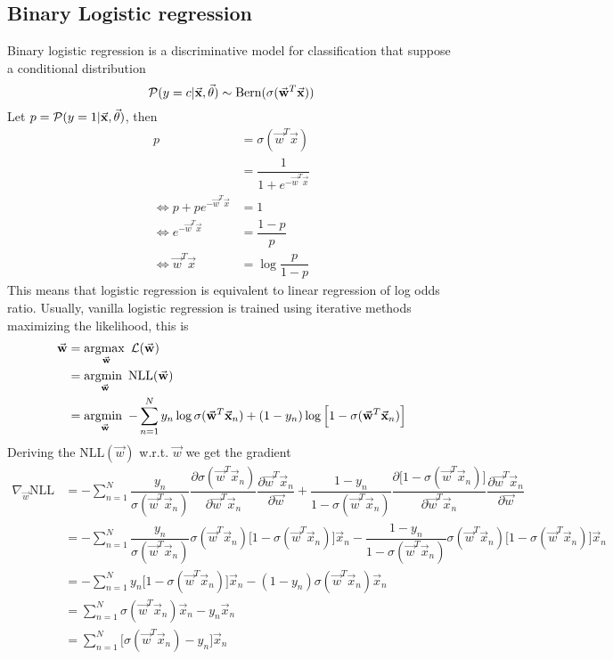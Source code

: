 \documentclass[../main.tex]{subfiles}
\begin{document}
\subsection{Binary Logistic regression}
Binary logistic regression is a discriminative model for classification that suppose a conditional distribution
\begin{equation*}
    \p(y=c|\vec{x},\vec{\theta}) \sim \text{Bern}(\sigma(\vec{w}^T \vec{x}))
\end{equation*}
Let $p=\p(y=1|\vec{x},\vec{\theta})$, then
\begin{align*}
    p &= \sigma(\vec{w}^T \vec{x})\\
    &= \dfrac{1}{1 + e^{-\vec{w}^T \vec{x}}}\\
    \Longleftrightarrow 
    p + pe^{-\vec{w}^T \vec{x}} &= 1\\
    \Longleftrightarrow 
    e^{-\vec{w}^T \vec{x}} &= \dfrac{1 - p}{p}\\
    \Longleftrightarrow 
    \vec{w}^T \vec{x} &= \log\dfrac{p}{1 - p}    
\end{align*}
This means that logistic regression is equivalent to linear regression of log odds ratio. Usually, vanilla logistic regression is trained using iterative methods maximizing the likelihood, this is
\begin{align*}
    \vec{w} &= \argmax_{\vec{w}} \mathcal{L}(\vec{w})\\
    &= \argmin_{\vec{w}} \text{NLL}(\vec{w})\\
    &= \argmin_{\vec{w}} -\sum_{n=1}^N y_n\log\sigma(\vec{w}^T\vec{x}_n) +  (1-y_n)\log\Big[1-\sigma(\vec{w}^T\vec{x}_n)\Big]
\end{align*}
Deriving the $\text{NLL}(\vec{w})$ w.r.t. $\vec{w}$ we get the gradient
\begin{align*}
    \nabla_{\vec{w}} \text{NLL} 
    &= -\sum_{n=1}^N 
    \dfrac{y_n}{\sigma(\vec{w}^T\vec{x}_n)}
    \dfrac{\partial\sigma(\vec{w}^T\vec{x}_n)}{\partial\vec{w}^T\vec{x}_n}
    \dfrac{\partial\vec{w}^T\vec{x}_n}{\partial\vec{w}} 
    +
    \dfrac{1-y_n}{1-\sigma(\vec{w}^T\vec{x}_n)}
    \dfrac{\partial\Big[1-\sigma(\vec{w}^T\vec{x}_n)\Big]}{\partial\vec{w}^T\vec{x}_n} \dfrac{\partial\vec{w}^T\vec{x}_n}{\partial\vec{w}}\\
    &= -\sum_{n=1}^N 
    \dfrac{y_n}{\sigma(\vec{w}^T\vec{x}_n)}
    \sigma(\vec{w}^T\vec{x}_n)\Big[1-\sigma(\vec{w}^T\vec{x}_n)\Big]\vec{x}_n
    -
    \dfrac{1-y_n}{1-\sigma(\vec{w}^T\vec{x}_n)}
    \sigma(\vec{w}^T\vec{x}_n)\Big[1-\sigma(\vec{w}^T\vec{x}_n)\Big]\vec{x}_n\\
    &= -\sum_{n=1}^N 
    y_n\Big[1-\sigma(\vec{w}^T\vec{x}_n)\Big]\vec{x}_n
    -
    (1-y_n)
    \sigma(\vec{w}^T\vec{x}_n)\vec{x}_n\\
    &= \sum_{n=1}^N 
    \sigma(\vec{w}^T\vec{x}_n)\vec{x}_n
    -y_n\vec{x}_n\\
    &= \sum_{n=1}^N 
    \Big[\sigma(\vec{w}^T\vec{x}_n)-y_n\Big]\vec{x}_n\\
\end{align*}
\end{document}

